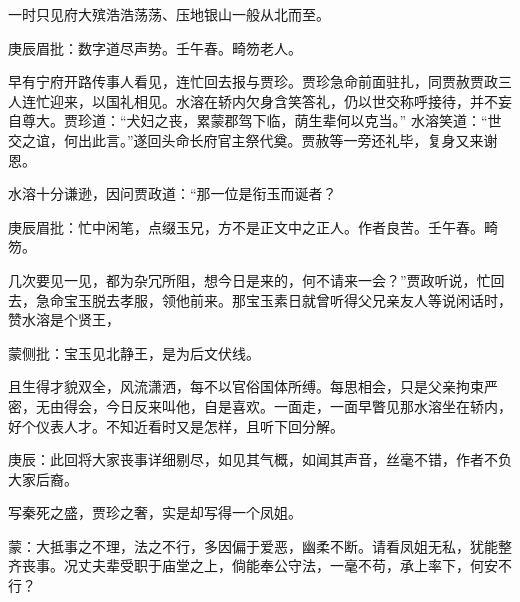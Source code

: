 \begin{parag}


    一时只见府大殡浩浩荡荡、压地银山一般从北而至。\begin{note}庚辰眉批：数字道尽声势。壬午春。畸笏老人。\end{note}早有宁府开路传事人看见，连忙回去报与贾珍。贾珍急命前面驻扎，同贾赦贾政三人连忙迎来，以国礼相见。水溶在轿内欠身含笑答礼，仍以世交称呼接待，并不妄自尊大。贾珍道：“犬妇之丧，累蒙郡驾下临，荫生辈何以克当。” 水溶笑道：“世交之谊，何出此言。”遂回头命长府官主祭代奠。贾赦等一旁还礼毕，复身又来谢恩。
\end{parag}


\begin{parag}


    水溶十分谦逊，因问贾政道：“那一位是衔玉而诞者？\begin{note}庚辰眉批：忙中闲笔，点缀玉兄，方不是正文中之正人。作者良苦。壬午春。畸笏。\end{note}几次要见一见，都为杂冗所阻，想今日是来的，何不请来一会？”贾政听说，忙回去，急命宝玉脱去孝服，领他前来。那宝玉素日就曾听得父兄亲友人等说闲话时，赞水溶是个贤王，\begin{note}蒙侧批：宝玉见北静王，是为后文伏线。\end{note}且生得才貌双全，风流潇洒，每不以官俗国体所缚。每思相会，只是父亲拘束严密，无由得会，今日反来叫他，自是喜欢。一面走，一面早瞥见那水溶坐在轿内，好个仪表人才。不知近看时又是怎样，且听下回分解。
\end{parag}

\begin{parag}

    \begin{note}庚辰：此回将大家丧事详细剔尽，如见其气概，如闻其声音，丝毫不错，作者不负大家后裔。\end{note}
\end{parag}


\begin{parag}


    \begin{note}写秦死之盛，贾珍之奢，实是却写得一个凤姐。\end{note}
\end{parag}


\begin{parag}


    \begin{note}蒙：大抵事之不理，法之不行，多因偏于爱恶，幽柔不断。请看凤姐无私，犹能整齐丧事。况丈夫辈受职于庙堂之上，倘能奉公守法，一毫不苟，承上率下，何安不行？\end{note}
\end{parag}